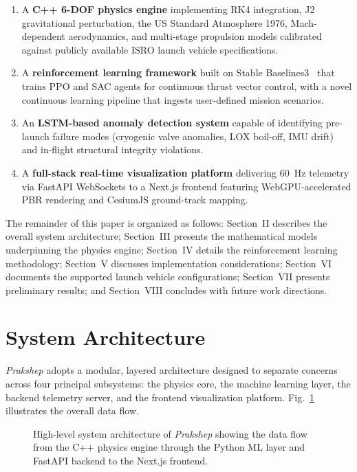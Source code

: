\documentclass[conference]{IEEEtran}
\begin{document}
\begin{enumerate}
    \item A \textbf{C++ 6-DOF physics engine} implementing RK4 integration, J2 gravitational perturbation, the US Standard Atmosphere 1976, Mach-dependent aerodynamics, and multi-stage propulsion models calibrated against publicly available ISRO launch vehicle specifications.
    \item A \textbf{reinforcement learning framework} built on Stable Baselines3~\cite{raffin2021stable} that trains PPO and SAC agents for continuous thrust vector control, with a novel continuous learning pipeline that ingests user-defined mission scenarios.
    \item An \textbf{LSTM-based anomaly detection system} capable of identifying pre-launch failure modes (cryogenic valve anomalies, LOX boil-off, IMU drift) and in-flight structural integrity violations.
    \item A \textbf{full-stack real-time visualization platform} delivering 60~Hz telemetry via FastAPI WebSockets to a Next.js frontend featuring WebGPU-accelerated PBR rendering and CesiumJS ground-track mapping.
\end{enumerate}

The remainder of this paper is organized as follows: Section~II describes the overall system architecture; Section~III presents the mathematical models underpinning the physics engine; Section~IV details the reinforcement learning methodology; Section~V discusses implementation considerations; Section~VI documents the supported launch vehicle configurations; Section~VII presents preliminary results; and Section~VIII concludes with future work directions.

\section{System Architecture}

\textit{Prakshep} adopts a modular, layered architecture designed to separate concerns across four principal subsystems: the physics core, the machine learning layer, the backend telemetry server, and the frontend visualization platform. Fig.~\ref{fig:architecture} illustrates the overall data flow.

\begin{figure}[htbp]
    \centering
    \caption{High-level system architecture of \textit{Prakshep} showing the data flow from the C++ physics engine through the Python ML layer and FastAPI backend to the Next.js frontend.}
    \label{fig:architecture}
\end{figure}
\end{document}

